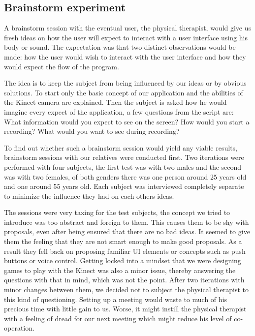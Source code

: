 \subsection{Brainstorm experiment}

A brainstorm session with the eventual user, the physical therapist, would give us fresh ideas on how the user will expect to interact with a user interface using his body or sound. The expectation was that two distinct observations would be made: how the user would wish to interact with the user interface and how they would expect the flow of the program. 


The idea is to keep the subject from being influenced by our ideas or by obvious solutions. To start only the basic concept of our application and the abilities of the Kinect camera are explained. Then the subject is asked how he would imagine every expect of the application, a few questions from the script are: What information would you expect to see on the screen? How would you start a recording? What would you want to see during recording? 

To find out whether such a brainstorm session would yield any viable results, brainstorm sessions with our relatives were conducted first. Two iterations were performed with four subjects, the first test was with two males and the second was with two females, of both genders there was one person around 25 years old and one around 55 years old. Each subject was interviewed completely separate to minimize the influence they had on each others ideas.

The sessions were very taxing for the test subjects, the concept we tried to introduce was too abstract and foreign to them. This causes them to be shy with proposals, even after being ensured that there are no bad ideas. It seemed to give them the feeling that they are not smart enough to make good proposals. As a result they fell back on proposing  familiar UI elements or concepts such as push buttons or voice control. Getting locked into a mindset that we were designing games to play with the Kinect was also a minor issue, thereby answering the questions with that in mind, which was not the point. After two iterations with minor changes between them, we decided not to subject the physical therapist to this kind of questioning. Setting up a meeting would waste to much of his precious time with little gain to us. Worse, it might instill the physical therapist with a feeling of dread for our next meeting which might reduce his level of co-operation. 

